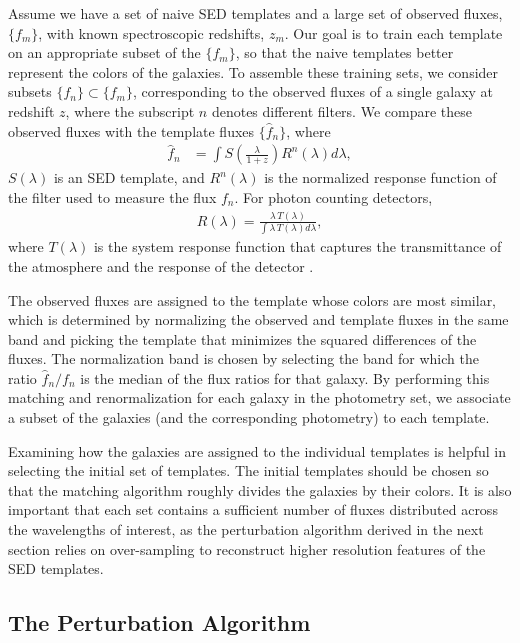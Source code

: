 Assume we have a set of naive SED templates and a large set of observed fluxes, $\{f_m\}$, with known spectroscopic redshifts, $z_m$. 
Our goal is to train each template on an appropriate subset of the $\{f_m\}$, so that the naive templates better represent the colors of the galaxies. 
To assemble these training sets, we consider subsets $\{f_n\} \subset \{f_m\}$, corresponding to the observed fluxes of a single galaxy at redshift $z$, where the subscript $n$ denotes different filters. 
We compare these observed fluxes with the template fluxes $\{\hat{f}_n\}$, where
\begin{align}
    \hat{f}_n &= \int S\left(\frac{\lambda}{1+z}\right) R^n(\lambda) d\lambda, \label{eq:calc_flux1}
\end{align}
$S(\lambda)$ is an SED template, and $R^n(\lambda)$ is the normalized response function of the filter used to measure the flux $f_n$.
For photon counting detectors,
\begin{align}
    R(\lambda) = \frac{\lambda \, T(\lambda)}{\int \lambda \, T(\lambda) d\lambda},
\end{align}
where $T(\lambda)$ is the system response function that captures the transmittance of the atmosphere and the response of the detector \citep{Bessell2005}.

The observed fluxes are assigned to the template whose colors are most similar, which is determined by normalizing the observed and template fluxes in the same band and picking the template that minimizes the squared differences of the fluxes. 
The normalization band is chosen by selecting the band for which the ratio $\hat{f}_n / f_n$ is the median of the flux ratios for that galaxy. 
By performing this matching and renormalization for each galaxy in the photometry set, we associate a subset of the galaxies (and the corresponding photometry) to each template.

Examining how the galaxies are assigned to the individual templates is helpful in selecting the initial set of templates.
The initial templates should be chosen so that the matching algorithm roughly divides the galaxies by their colors.
It is also important that each set contains a sufficient number of fluxes distributed across the wavelengths of interest, as the perturbation algorithm derived in the next section relies on over-sampling to reconstruct higher resolution features of the SED templates.



\subsection{The Perturbation Algorithm}
\label{sect:perturbation}

